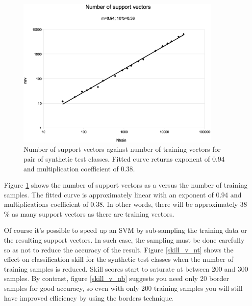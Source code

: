\documentclass[11pt]{article}
\begin{document}
\begin{figure}
\includegraphics[width=0.9\textwidth]{nsv}
\caption{Number of support vectors against number of training vectors for pair of synthetic test classes. Fitted curve returns exponent of 0.94 and multiplication coefficient of 0.38.}
\label{nsv}
\end{figure}

Figure \ref{nsv} shows the number of support vectors as a versus the
number of training samples. The fitted curve is approximately linear 
with an exponent of 0.94 and multiplications coefficient of 0.38.
In other words, there will be approximately 38 \% as many support vectors as 
there are training vectors.

Of course it's possible to speed up an SVM by sub-sampling the training data
or the resulting support vectors.
In such case, the sampling must be done carefully so as not to reduce the
accuracy of the result.
Figure \ref{skill_v_nt} shows the effect on classification skill for the
synthetic test classes when the number of training samples is reduced.
Skill scores start to saturate at between 200 and 300 samples.
By contrast, figure \ref{skill_v_nb} suggests you need only 20 border samples
for good accuracy, so even with only 200 training samples you will still
have improved efficiency by using the borders technique.
\end{document}
